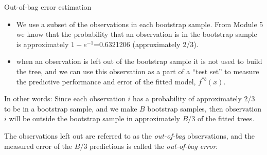 \documentclass[10pt,ignorenonframetext,]{beamer}
\providecommand{\tightlist}{%
  \setlength{\itemsep}{0pt}\setlength{\parskip}{0pt}}
\begin{document}
\begin{frame}

\begin{block}{Out-of-bag error estimation}

\begin{itemize}
\tightlist
\item
  We use a subset of the observations in each bootstrap sample. From
  Module 5 we know that the probability that an observation is in the
  bootstrap sample is approximately \(1-e^{-1}\)=0.6321206
  (approximately 2/3).
\item
  when an observation is left out of the bootstrap sample it is not used
  to build the tree, and we can use this observation as a part of a
  ``test set'' to measure the predictive performance and error of the
  fitted model, \(f^{*b}(x)\).
\end{itemize}

In other words: Since each observation \(i\) has a probability of
approximately 2/3 to be in a bootstrap sample, and we make \(B\)
bootstrap samples, then observation \(i\) will be outside the bootstrap
sample in approximately \(B/3\) of the fitted trees.

The observations left out are referred to as the \emph{out-of-bag}
observations, and the measured error of the \(B/3\) predictions is
called the \emph{out-of-bag error}.

\end{block}

\end{frame}
\end{document}
